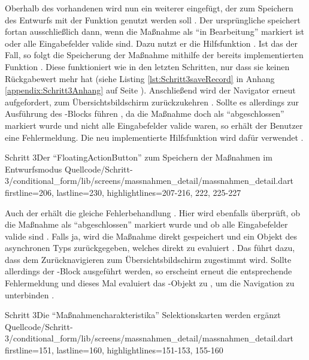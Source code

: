 Oberhalb des vorhandenen  wird nun ein weiterer eingefügt, der zum Speichern des Entwurfs mit der Funktion  genutzt werden soll .
Der ursprüngliche  speichert fortan ausschließlich dann, wenn die Maßnahme als \enquote{in Bearbeitung} markiert ist oder alle Eingabefelder valide sind.
Dazu nutzt er die Hilfsfunktion  .
Ist das der Fall, so folgt die Speicherung der Maßnahme mithilfe der bereits implementierten Funktion  .
Diese funktioniert wie in den letzten Schritten, nur dass sie keinen Rückgabewert mehr hat (siehe Listing \ref{lst:Schritt3saveRecord} in Anhang \ref{appendix:Schritt3Anhang} auf Seite \pageref{appendix:Schritt3Anhang}).
Anschließend wird der Navigator erneut aufgefordert, zum Übersichtsbildschirm zurückzukehren .
Sollte es allerdings zur Ausführung des -Blocks führen ,
da die Maßnahme doch als \enquote{abgeschlossen} markiert wurde und nicht alle Eingabefelder valide waren,
so erhält der Benutzer eine Fehlermeldung. Die neu implementierte Hilfsfunktion  wird dafür verwendet . 
   
\begin{alexlisting}{Schritt 3}{Der \enquote{FloatingActionButton} zum Speichern der Maßnahmen im Entwurfsmodus}
    {Quellcode/Schritt-3/conditional_form/lib/screens/massnahmen_detail/massnahmen_detail.dart}
    {firstline=206, lastline=230, highlightlines={207-216, 222, 225-227}}
    \label{lst:Schritt3FloatingActionButton}
\end{alexlisting} 

Auch der  erhält die gleiche Fehlerbehandlung \Lst{\ref{lst:Schritt3onWillPop}}.
Hier wird ebenfalls überprüft, ob die Maßnahme als \enquote{abgeschlossen} markiert wurde und ob alle Eingabefelder valide sind .
Falls ja, wird die Maßnahme direkt gespeichert und ein Objekt des asynchronen Typs  zurückgegeben, welches direkt zu  evaluiert .
Das führt dazu, dass dem Zurücknavigieren zum Übersichtsbildschirm zugestimmt wird.
Sollte allerdings der -Block ausgeführt werden, so erscheint erneut die entsprechende Fehlermeldung  und dieses Mal evaluiert das -Objekt zu , um die Navigation zu unterbinden .

\begin{alexlisting}{Schritt 3}{Die \enquote{Maßnahmencharakteristika} Selektionskarten werden ergänzt}
    {Quellcode/Schritt-3/conditional_form/lib/screens/massnahmen_detail/massnahmen_detail.dart}
    {firstline=151, lastline=160, highlightlines={151-153, 155-160}}
    \label{lst:Schritt3onWillPop}
\end{alexlisting}

